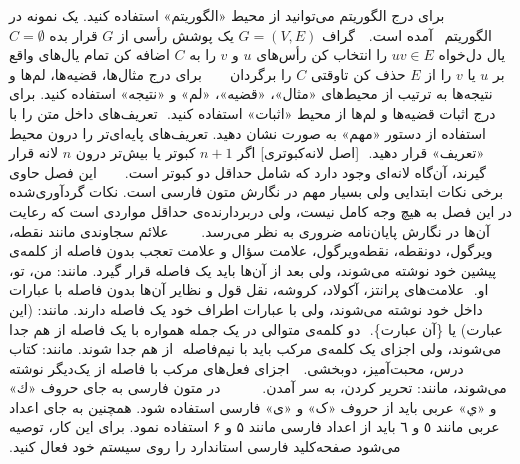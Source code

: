 ‫
‫
‫
‫
‫
‫
‫برای درج الگوریتم می‌توانید از محیط «الگوریتم» استفاده کنید.
‫یک نمونه در الگوریتم~ آمده است.
‫
‫
‫ گراف $G=(V, E)$
‫ یک پوشش رأسی از $G$
‫
‫ قرار بده $C = \emptyset$  %
‫
‫%
‫%
‫%
‫ یال دل‌‌خواه $uv \in E$ را انتخاب کن
‫ رأس‌های $u$ و $v$ را به $C$ اضافه کن
‫ تمام یال‌های واقع بر $u$ یا $v$ را از $E$ حذف کن
‫‌تاوقتی
‫ $C$ را برگردان
‫
‫
‫
‫
‫
‫برای درج مثال‌ها، قضیه‌ها، لم‌ها و نتیجه‌ها به ترتیب از محیط‌های
‫«مثال»، «قضیه»، «لم» و «نتیجه» استفاده کنید.
‫برای درج اثبات قضیه‌ها و لم‌ها  از محیط «اثبات» استفاده کنید.
‫
‫تعریف‌های داخل متن را با استفاده از دستور «مهم» به صورت  نشان دهید.
‫تعریف‌های پایه‌ای‌تر را درون محیط «تعریف» قرار دهید.
‫
‫[اصل لانه‌کبوتری]
‫اگر $n+1$ کبوتر یا بیش‌تر درون  $n$ لانه قرار گیرند، آن‌گاه لانه‌ای 
‫وجود دارد که شامل حداقل دو کبوتر است.
‫
‫
‫
‫
‫
‫
‫
‫این فصل حاوی برخی نکات ابتدایی ولی بسیار مهم در نگارش متون فارسی است. 
‫نکات گردآوری‌شده در این فصل به‌ هیچ‌ وجه کامل نیست، 
‫ولی دربردارنده‌ی حداقل مواردی است که رعایت آن‌ها در نگارش پایان‌نامه ضروری به نظر می‌رسد.
‫
‫
‫
‫
‫
‫ 
‫علائم سجاوندی مانند نقطه، ویرگول، دونقطه، نقطه‌ویرگول، علامت سؤال و علامت تعجب %
‫بدون فاصله از کلمه‌ی پیشین خود نوشته می‌شوند، ولی بعد از آن‌ها باید یک فاصله‌ قرار گیرد. مانند: من، تو، او.
‫ 
‫علامت‌های پرانتز، آکولاد، کروشه، نقل قول و نظایر آن‌ها بدون فاصله با عبارات داخل خود نوشته می‌شوند، ولی با عبارات اطراف خود یک فاصله دارند. مانند: (این عبارت) یا \{آن عبارت\}.
‫ 
‫دو کلمه‌ی متوالی در یک جمله همواره با یک فاصله از هم جدا می‌شوند، ولی اجزای یک کلمه‌ی مرکب باید با نیم‌فاصله‌‌
‫ از هم جدا شوند. مانند: کتاب درس، محبت‌آمیز، دوبخشی.
‫  
‫ اجزای فعل‌های مرکب با فاصله از یک‌دیگر نوشته می‌شوند، مانند: تحریر کردن، به سر آمدن.
‫
‫
‫
‫
‫
‫
‫
‫ 
‫در متون فارسی به جای حروف «ك» و «ي» عربی باید از حروف «ک» و «ی» فارسی استفاده شود. همچنین به جای اعداد عربی مانند ٥ و ٦ باید از اعداد فارسی مانند ۵ و ۶ استفاده نمود. 
‫برای این کار، توصیه می‌شود صفحه‌کلید‌ فارسی استاندارد را روی سیستم خود فعال کنید.
